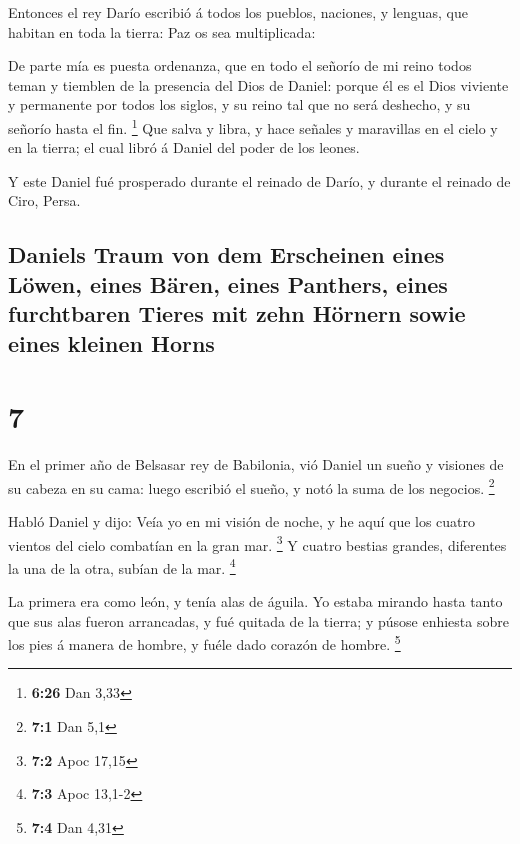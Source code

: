  Entonces el rey Darío escribió á todos los pueblos,
naciones, y lenguas, que habitan en toda la tierra: Paz os sea
multiplicada:

 De parte mía es puesta ordenanza, que en todo el señorío
de mi reino todos teman y tiemblen de la presencia del Dios de Daniel:
porque él es el Dios viviente y permanente por todos los siglos, y su
reino tal que no será deshecho, y su señorío hasta el fin. \footnote{\textbf{6:26}
  Dan 3,33}  Que salva y libra, y hace señales y maravillas
en el cielo y en la tierra; el cual libró á Daniel del poder de los
leones.

 Y este Daniel fué prosperado durante el reinado de Darío,
y durante el reinado de Ciro, Persa.

\hypertarget{daniels-traum-von-dem-erscheinen-eines-luxf6wen-eines-buxe4ren-eines-panthers-eines-furchtbaren-tieres-mit-zehn-huxf6rnern-sowie-eines-kleinen-horns}{%
\subsection{Daniels Traum von dem Erscheinen eines Löwen, eines Bären,
eines Panthers, eines furchtbaren Tieres mit zehn Hörnern sowie eines
kleinen
Horns}\label{daniels-traum-von-dem-erscheinen-eines-luxf6wen-eines-buxe4ren-eines-panthers-eines-furchtbaren-tieres-mit-zehn-huxf6rnern-sowie-eines-kleinen-horns}}

\hypertarget{section-6}{%
\section{7}\label{section-6}}

 En el primer año de Belsasar rey de Babilonia, vió Daniel
un sueño y visiones de su cabeza en su cama: luego escribió el sueño, y
notó la suma de los negocios. \footnote{\textbf{7:1} Dan 5,1}

 Habló Daniel y dijo: Veía yo en mi visión de noche, y he
aquí que los cuatro vientos del cielo combatían en la gran mar.
\footnote{\textbf{7:2} Apoc 17,15}  Y cuatro bestias
grandes, diferentes la una de la otra, subían de la mar. \footnote{\textbf{7:3}
  Apoc 13,1-2}

 La primera era como león, y tenía alas de águila. Yo estaba
mirando hasta tanto que sus alas fueron arrancadas, y fué quitada de la
tierra; y púsose enhiesta sobre los pies á manera de hombre, y fuéle
dado corazón de hombre. \footnote{\textbf{7:4} Dan 4,31}

